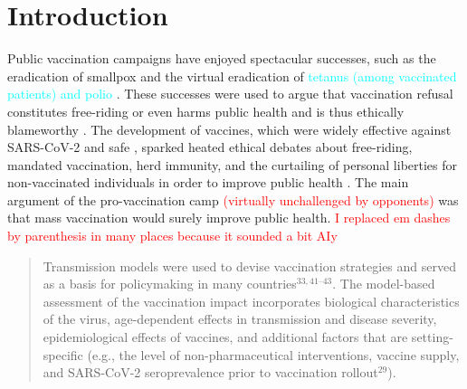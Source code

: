 \documentclass[a4paper,12pt]{article}
\newcommand{\juergen}[1]{\textcolor{cyan}{#1}}
\newcommand{\ignacio}[1]{\textcolor{red}{#1}}
\begin{document}
\section{Introduction}\label{sec:Intro}
Public vaccination campaigns have enjoyed spectacular successes, such as the eradication of smallpox and the virtual eradication of \juergen{tetanus (among vaccinated patients) and polio} \cite{Haelle2024}. These successes were used to argue that vaccination refusal constitutes free-riding or even harms public health and is thus ethically blameworthy \cite{Giubilini2018,Hoven2012}. The development of vaccines, which were widely effective against SARS-CoV-2 \cite{Altmann2022} and safe \cite{Sessa2021}, sparked heated ethical debates about free-riding, mandated vaccination, herd immunity, and the curtailing of personal liberties for non-vaccinated individuals in order to improve public health \cite{Bernstein2023,Bradley2021,Choy2022,ChuanVoo2022,Giubilini2020,Graeber2021,Kelsall2024,Kraaijeveld2022,Singer2021,Williams2021a}. The main argument of the pro-vaccination camp \ignacio{(virtually unchallenged by opponents)} was that mass vaccination would surely improve public health. \ignacio{I replaced em dashes by parenthesis in many places because it sounded a bit AIy}
\begin{quote}
Transmission models were used to devise vaccination strategies and served as a basis for policymaking in many countries$^{33,41–43}$. The model-based assessment of the vaccination impact incorporates biological characteristics of the virus, age-dependent effects in transmission and disease severity, epidemiological effects of vaccines, and additional factors that are setting-specific (e.g., the level of non-pharmaceutical interventions, vaccine supply, and SARS-CoV-2 seroprevalence prior to vaccination rollout$^{29}$). \cite[P.\ 3]{Rouzine2023} 
\end{quote}
\end{document}
